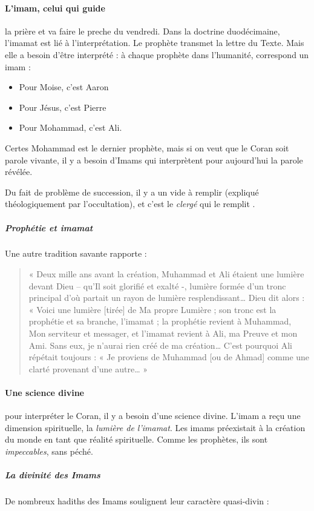  \paragraph{L'imam, celui qui guide} la prière et va faire le preche du vendredi.  Dans la doctrine duodécimaine, l'imamat est lié à l'interprétation.
 Le prophète transmet la lettre du Texte. Mais elle a besoin d'être interprété : à chaque prophète dans l'humanité, correspond un imam : 
 \begin{itemize}
     \item Pour Moise, c'est Aaron
     \item Pour Jésus, c'est Pierre
     \item Pour Mohammad, c'est Ali.
 \end{itemize}
 Certes Mohammad est le dernier prophète, mais si on veut que le Coran soit parole vivante, il y a besoin d'Imams qui interprètent pour aujourd'hui la parole révélée.
 
 Du fait de problème de succession, il y a un vide à remplir (expliqué théologiquement par l'occultation), et c'est le \textit{clergé} qui le remplit .
 
 
 
  
  \subparagraph{Prophétie et imamat}
  
 
Une autre tradition savante rapporte :
\begin{quote}
    

« Deux mille ans avant la création, Muhammad et Ali étaient une lumière
devant Dieu -- qu'Il soit glorifié et exalté -, lumière formée d'un
tronc principal d'où partait un rayon de lumière resplendissant\ldots{}
Dieu dit alors : « Voici une lumière {[}tirée{]} de Ma propre Lumière ;
son tronc est la prophétie et sa branche, l'imamat ; la prophétie
revient à Muhammad, Mon serviteur et messager, et l'imamat revient à
Ali, ma Preuve et mon Ami. Sans eux, je n'aurai rien créé de ma
création\ldots{} C'est pourquoi Ali répétait toujours : « Je proviens de
Muhammad {[}ou de Ahmad{]} comme une clarté provenant d'une
autre\ldots{} »
\end{quote}


 \paragraph{Une science divine} pour interpréter le Coran, il y a besoin d'une science divine. L'imam a reçu une dimension spirituelle, la \textit{lumière de l'imamat}. Les imams préexistait à la création du monde en tant que réalité spirituelle. Comme les prophètes, ils sont \textit{impeccables}, sans péché.
   \subparagraph{La divinité des Imams}
De nombreux hadiths des Imams soulignent leur caractère quasi-divin : 


